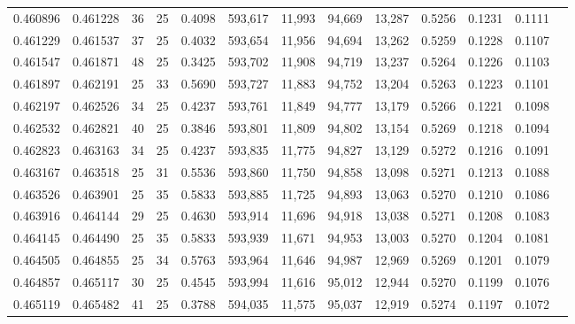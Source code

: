 \begin{tabular}{rrrrrrrrrrrrr}
0.460896 & 0.461228 &    36 &  25 &                                     0.4098 & 593,617 &  11,993 &  94,669 &  13,287 & 0.5256 & 0.1231 & 0.1111 \\
0.461229 & 0.461537 &    37 &  25 &                                     0.4032 & 593,654 &  11,956 &  94,694 &  13,262 & 0.5259 & 0.1228 & 0.1107 \\
0.461547 & 0.461871 &    48 &  25 &                                     0.3425 & 593,702 &  11,908 &  94,719 &  13,237 & 0.5264 & 0.1226 & 0.1103 \\
0.461897 & 0.462191 &    25 &  33 &                                     0.5690 & 593,727 &  11,883 &  94,752 &  13,204 & 0.5263 & 0.1223 & 0.1101 \\
0.462197 & 0.462526 &    34 &  25 &                                     0.4237 & 593,761 &  11,849 &  94,777 &  13,179 & 0.5266 & 0.1221 & 0.1098 \\
0.462532 & 0.462821 &    40 &  25 &                                     0.3846 & 593,801 &  11,809 &  94,802 &  13,154 & 0.5269 & 0.1218 & 0.1094 \\
0.462823 & 0.463163 &    34 &  25 &                                     0.4237 & 593,835 &  11,775 &  94,827 &  13,129 & 0.5272 & 0.1216 & 0.1091 \\
0.463167 & 0.463518 &    25 &  31 &                                     0.5536 & 593,860 &  11,750 &  94,858 &  13,098 & 0.5271 & 0.1213 & 0.1088 \\
0.463526 & 0.463901 &    25 &  35 &                                     0.5833 & 593,885 &  11,725 &  94,893 &  13,063 & 0.5270 & 0.1210 & 0.1086 \\
0.463916 & 0.464144 &    29 &  25 &                                     0.4630 & 593,914 &  11,696 &  94,918 &  13,038 & 0.5271 & 0.1208 & 0.1083 \\
0.464145 & 0.464490 &    25 &  35 &                                     0.5833 & 593,939 &  11,671 &  94,953 &  13,003 & 0.5270 & 0.1204 & 0.1081 \\
0.464505 & 0.464855 &    25 &  34 &                                     0.5763 & 593,964 &  11,646 &  94,987 &  12,969 & 0.5269 & 0.1201 & 0.1079 \\
0.464857 & 0.465117 &    30 &  25 &                                     0.4545 & 593,994 &  11,616 &  95,012 &  12,944 & 0.5270 & 0.1199 & 0.1076 \\
0.465119 & 0.465482 &    41 &  25 &                                     0.3788 & 594,035 &  11,575 &  95,037 &  12,919 & 0.5274 & 0.1197 & 0.1072 \\

\end{tabular}
